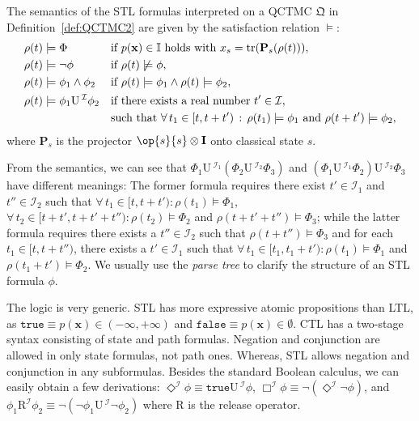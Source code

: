 \documentclass[a4paper,UKenglish,cleveref,autoref,thm-restate,authorcolumns]{lipics-v2019}
\newcommand{\QC}{\mathfrak{Q}}
\newcommand{\I}{\mathcal{I}}
\newcommand{\II}{\mathbb{I}}
\newcommand{\PP}{\mathbf{P}}
\newcommand{\id}{\mathbf{I}}
\newcommand{\tr}{\mathrm{tr}}
\newcommand{\x}{\mathbf{x}}
\newcommand{\ntl}{\mathrm{U}\,}
\newcommand{\true}{\texttt{true}}
\newcommand{\false}{\texttt{false}}
\begin{document}
\begin{definition}\label{def:semantics}
	The semantics of the STL formulas interpreted on a QCTMC $\QC$ in Definition~\ref{def:QCTMC2}
	are given by the satisfaction relation $\models$:
	\begin{align*}
		\rho(t) & \models \Phi
		&& \textup{if } p(\x) \in \II
		\textup{ holds with }x_s = \tr(\PP_s(\rho(t))), \\
		\rho(t) & \models \neg\phi
		&& \textup{if } \rho(t) \not\models \phi, \\
		\rho(t) & \models \phi_1 \wedge \phi_2
		&& \textup{if } \rho(t) \models \phi_1 \wedge \rho(t) \models \phi_2, \\
		\rho(t) & \models \phi_1 \ntl^\I \phi_2
		&& \textup{if there exists a real number }t' \in \I, \\
		&&& \textup{such that }\forall\,t_1 \in [t,t+t') \,:\, \rho(t_1) \models \phi_1
		\textup{ and }\rho(t+t') \models \phi_2,
	\end{align*}
	where $\PP_s$ is the projector $\op{s}{s} \otimes \id$ onto classical state $s$.
\end{definition}

From the semantics, we can see that
$\Phi_1 \ntl^{\I_1} (\Phi_2 \ntl^{\I_2} \Phi_3)$
and $(\Phi_1 \ntl^{\I_1} \Phi_2) \ntl^{\I_2} \Phi_3$ have different meanings:
The former formula requires there exist $t'\in \I_1$ and $t''\in \I_2$
such that $\forall\,t_1\in[t,t+t'): \rho(t_1) \models \Phi_1$,
$\forall\,t_2\in[t+t',t+t'+t''): \rho(t_2) \models \Phi_2$ and $\rho(t+t'+t'') \models \Phi_3$;
while the latter formula requires there exists a $t''\in \I_2$
such that $\rho(t+t'') \models \Phi_3$
and for each $t_1\in[t,t+t'')$, there exists a $t'\in \I_1$
such that $\forall\,t_1\in[t_1,t_1+t'): \rho(t_1) \models \Phi_1$
and $\rho(t_1+t') \models \Phi_2$.
We usually use the \emph{parse tree}
to clarify the structure of an STL formula $\phi$.

The logic is very generic.
STL has more expressive atomic propositions than LTL,
as $\true \equiv p(\x) \in (-\infty,+\infty)$ and $\false \equiv p(\x) \in \emptyset$.
CTL has a two-stage syntax consisting of state and path formulas.
Negation and conjunction are allowed in only state formulas, not path ones.
Whereas, STL allows negation and conjunction in any subformulas.
Besides the standard Boolean calculus,
we can easily obtain a few derivations:
$\Diamond^\I \phi \equiv  \true \ntl^\I \phi$,
$\Box^\I \phi \equiv \neg(\Diamond^\I \neg \phi)$,
and $\phi_1 \mathrm{R}^\I \phi_2 \equiv \neg (\neg\phi_1 \ntl^\I \neg\phi_2)$
where $\mathrm{R}$ is the release operator.
	
\end{document}
